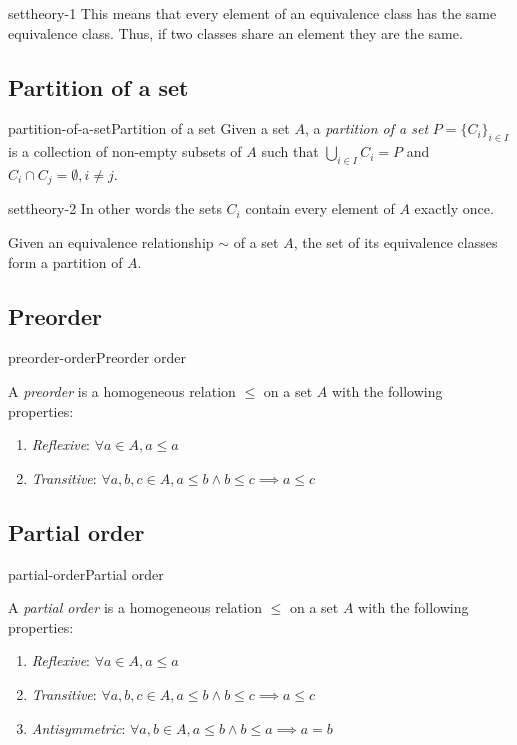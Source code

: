 \documentclass[preview]{standalone}
\begin{document}
\begin{snippet}{settheory-1}
This means that every element of an equivalence class has the same equivalence class.
Thus, if two classes share an element they are the same.
\end{snippet}

\subsection{Partition of a set}

\begin{snippetdefinition}{partition-of-a-set}{Partition of a set}{
    Given a set \(A\), a \textit{partition of a set} \(P={\{C_i\}}_{i\in I}\) is a collection of
    non-empty subsets of \(A\) such that \(\bigcup_{i\in I} C_i = P\) and
    \(C_i \cap C_j = \emptyset, i \neq j\).
}
\end{snippetdefinition}

\begin{snippet}{settheory-2}
In other words the sets \(C_i\)
contain every element of \(A\) exactly once.

Given an equivalence relationship \(\sim\) of a set \(A\),
the set of its equivalence classes form a partition of \(A\).
\end{snippet}

\subsection{Preorder}

\begin{snippetdefinition}{preorder-order}{Preorder order}{
    A \textit{preorder} is a homogeneous relation \(\leq\) on a set \(A\)
    with the following properties:
    \begin{enumerate}
        \item \textit{Reflexive}: \(\forall a \in A, a \leq a\)
        \item \textit{Transitive}: \(\forall a,b,c \in A, a \leq b \land b \leq c \implies a \leq c\)
    \end{enumerate}
}
\end{snippetdefinition}

\subsection{Partial order}

\begin{snippetdefinition}{partial-order}{Partial order}{
    A \textit{partial order} is a homogeneous relation \(\leq\) on a set \(A\)
    with the following properties:
    \begin{enumerate}
        \item \textit{Reflexive}: \(\forall a \in A, a \leq a\)
        \item \textit{Transitive}: \(\forall a,b,c \in A, a \leq b \land b \leq c \implies a \leq c\)
        \item \textit{Antisymmetric}: \(\forall a,b \in A, a \leq b \land b \leq a \implies a=b\)
    \end{enumerate}
}
\end{snippetdefinition}
\end{document}
